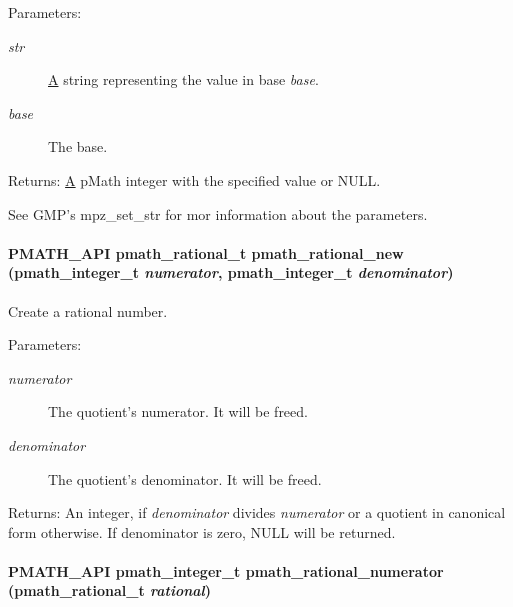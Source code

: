 \begin{Desc}
\item[Parameters:]
\begin{description}
\item[{\em str}]\hyperlink{class_a}{A} string representing the value in base {\em base\/}. \item[{\em base}]The base. \end{description}
\end{Desc}
\begin{Desc}
\item[Returns:]\hyperlink{class_a}{A} pMath integer with the specified value or NULL.\end{Desc}
See GMP's mpz\_\-set\_\-str for mor information about the parameters. \hypertarget{group__numbers_g142d493a889a7d94bafe79025b61d220}{
\paragraph[{pmath\_\-rational\_\-new}]{\setlength{\rightskip}{0pt plus 5cm}PMATH\_\-API {\bf pmath\_\-rational\_\-t} pmath\_\-rational\_\-new ({\bf pmath\_\-integer\_\-t} {\em numerator}, \/  {\bf pmath\_\-integer\_\-t} {\em denominator})}\hfill}
\label{group__numbers_g142d493a889a7d94bafe79025b61d220}


Create a rational number. 

\begin{Desc}
\item[Parameters:]
\begin{description}
\item[{\em numerator}]The quotient's numerator. It will be freed. \item[{\em denominator}]The quotient's denominator. It will be freed. \end{description}
\end{Desc}
\begin{Desc}
\item[Returns:]An integer, if {\em denominator\/} divides {\em numerator\/} or a quotient in canonical form otherwise. If denominator is zero, NULL will be returned. \end{Desc}
\hypertarget{group__numbers_gab6f926fcf84e9cf62c0d99699e491bf}{
\paragraph[{pmath\_\-rational\_\-numerator}]{\setlength{\rightskip}{0pt plus 5cm}PMATH\_\-API {\bf pmath\_\-integer\_\-t} pmath\_\-rational\_\-numerator ({\bf pmath\_\-rational\_\-t} {\em rational})}\hfill}
\label{group__numbers_gab6f926fcf84e9cf62c0d99699e491bf}


